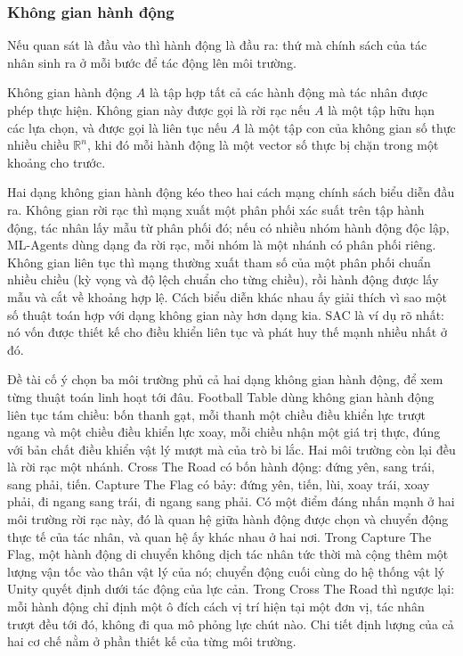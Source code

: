 \subsubsection{Không gian hành động}
\label{sub:action-space}
\indent Nếu quan sát là đầu vào thì hành động là đầu ra: thứ mà chính sách của tác nhân
sinh ra ở mỗi bước để tác động lên môi trường.

\begin{dn}
\label{dn:action}
Không gian hành động $A$ là tập hợp tất cả các hành động mà tác nhân được phép thực
hiện. Không gian này được gọi là rời rạc nếu $A$ là một tập hữu hạn các lựa
chọn, và được gọi là liên tục nếu $A$ là một tập con của không gian số thực
nhiều chiều $\mathbb{R}^{n}$, khi đó mỗi hành động là một vector số thực bị chặn trong
một khoảng cho trước.
\end{dn}

\indent Hai dạng không gian hành động kéo theo hai cách mạng chính sách biểu diễn đầu ra.
Không gian rời rạc thì mạng xuất một phân phối xác suất trên tập hành động, tác nhân lấy
mẫu từ phân phối đó; nếu có nhiều nhóm hành động độc lập, ML-Agents dùng dạng đa rời rạc,
mỗi nhóm là một nhánh có phân phối riêng. Không gian liên tục thì mạng thường xuất tham số
của một phân phối chuẩn nhiều chiều (kỳ vọng và độ lệch chuẩn cho từng chiều), rồi hành động
được lấy mẫu và cắt về khoảng hợp lệ. Cách biểu diễn khác nhau ấy giải thích vì sao
một số thuật toán hợp với dạng không gian này hơn dạng kia. SAC là ví dụ rõ nhất: nó vốn
được thiết kế cho điều khiển liên tục và phát huy thế mạnh nhiều nhất ở đó.

\indent Đề tài cố ý chọn ba môi trường phủ cả hai dạng không gian hành động, để xem từng
thuật toán linh hoạt tới đâu. Football Table dùng không gian hành động liên tục tám chiều:
bốn thanh gạt, mỗi thanh một chiều điều khiển lực trượt ngang và một chiều điều khiển lực
xoay, mỗi chiều nhận một giá trị thực, đúng với bản chất điều khiển vật lý mượt mà của
trò bi lắc. Hai môi trường còn lại đều là rời rạc một nhánh. Cross The Road có bốn hành
động: đứng yên, sang trái, sang phải, tiến. Capture The Flag có bảy: đứng yên, tiến, lùi,
xoay trái, xoay phải, đi ngang sang trái, đi ngang sang phải. Có một điểm đáng nhấn mạnh
ở hai môi trường rời rạc này, đó là quan hệ giữa hành động được chọn và chuyển động thực tế
của tác nhân, và quan hệ ấy khác nhau ở hai nơi. Trong Capture The Flag, một hành động
di chuyển không dịch tác nhân tức thời mà cộng thêm một lượng vận tốc vào thân vật lý của
nó; chuyển động cuối cùng do hệ thống vật lý Unity quyết định dưới tác động của lực cản.
Trong Cross The Road thì ngược lại: mỗi hành động chỉ định một ô đích cách vị trí hiện tại
một đơn vị, tác nhân trượt đều tới đó, không đi qua mô phỏng lực chút nào. Chi tiết định
lượng của cả hai cơ chế nằm ở phần thiết kế của từng môi trường.

